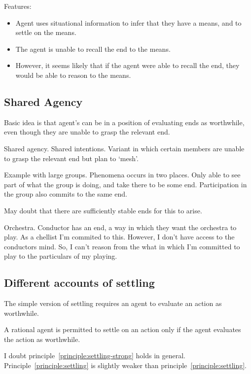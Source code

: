 \documentclass[10pt]{article}
\begin{document}
Features:
\begin{itemize}[noitemsep]
\item Agent uses situational information to infer that they have a means, and to settle on the means.
\item The agent is unable to recall the end to the means.
\item However, it seems likely that if the agent were able to recall the end, they would be able to reason to the means.
\end{itemize}



\subsection{Shared Agency}
\label{sec:shared-agency}

Basic idea is that agent's can be in a position of evaluating ends as worthwhile, even though they are unable to grasp the relevant end.

Shared agency.
Shared intentions.
Variant in which certain members are unable to grasp the relevant end but plan to `mesh'.

Example with large groups.
Phenomena occurs in two places.
Only able to see part of what the group is doing, and take there to be some end.
Participation in the group also commits to the same end.

May doubt that there are sufficiently stable ends for this to arise.

Orchestra.
Conductor has an end, a way in which they want the orchestra to play.
As a chellist I'm commited to this.
However, I don't have access to the conductors mind.
So, I can't reason from the what in which I'm committed to play to the particulars of my playing.


\subsection{Different accounts of settling}
\label{sec:diff-acco-settl}

The simple version of settling requires an agent to evaluate an action as worthwhile.

\begin{principle}\label{principle:settling-strong}
  A rational agent is permitted to settle on an action only if the agent evaluates the action as worthwhile.
\end{principle}

I doubt principle~\ref{principle:settling-strong} holds in general.
Principle~\ref{principle:settling} is slightly weaker than principle~\ref{principle:settling}.
\end{document}

